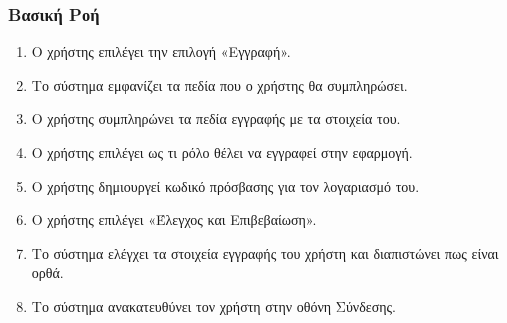 \documentclass[12pt,a4paper,twoside]{book}
\begin{document}
\subsubsection{Βασική Ροή}
\begin{enumerate}
  \item Ο χρήστης επιλέγει την επιλογή «Εγγραφή».  %
  \item Το σύστημα εμφανίζει τα πεδία που ο χρήστης θα συμπληρώσει. %
  \item Ο χρήστης συμπληρώνει τα πεδία εγγραφής με τα στοιχεία του.   %
  \item Ο χρήστης επιλέγει ως τι ρόλο θέλει να εγγραφεί στην εφαρμογή.  %
  \item Ο χρήστης δημιουργεί κωδικό πρόσβασης για τον λογαριασμό του.  %
  \item Ο χρήστης επιλέγει «Έλεγχος και Επιβεβαίωση».%
  \item Το σύστημα ελέγχει τα στοιχεία εγγραφής του χρήστη και διαπιστώνει πως είναι ορθά. %
  \item Το σύστημα ανακατευθύνει τον χρήστη στην οθόνη Σύνδεσης. %
\end{enumerate}
\end{document}
